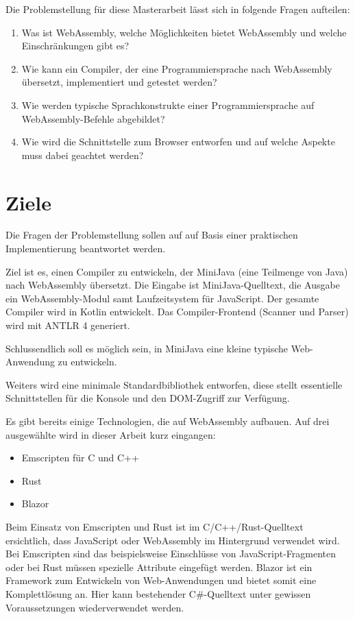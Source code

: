 Die Problemstellung für diese Masterarbeit lässt sich in folgende Fragen aufteilen:

\begin{enumerate}
	\item Was ist WebAssembly, welche Möglichkeiten bietet WebAssembly und welche Einschränkungen gibt es?
	\item Wie kann ein Compiler, der eine Programmiersprache nach WebAssembly übersetzt, implementiert und getestet werden?
	\item Wie werden typische Sprachkonstrukte einer Programmiersprache auf Web\-As\-sem\-bly-Befehle abgebildet?
	\item Wie wird die Schnittstelle zum Browser entworfen und auf welche Aspekte muss dabei geachtet werden?
\end{enumerate}

\section{Ziele}

Die Fragen der Problemstellung sollen auf auf Basis einer praktischen Implementierung beantwortet werden.

Ziel ist es, einen Compiler zu entwickeln, der MiniJava (eine Teilmenge von Java) nach WebAssembly übersetzt. Die Eingabe ist MiniJava-Quelltext, die Ausgabe ein WebAssembly-Modul samt Laufzeitsystem für JavaScript. Der gesamte Compiler wird in Kotlin entwickelt. Das Compiler-Frontend (Scanner und Parser) wird mit ANTLR 4 generiert.

Schlussendlich soll es möglich sein, in MiniJava eine kleine typische Web-Anwendung zu entwickeln.

Weiters wird eine minimale Standardbibliothek entworfen, diese stellt essentielle Schnittstellen für die Konsole und den DOM-Zugriff zur Verfügung.

Es gibt bereits einige Technologien, die auf WebAssembly aufbauen. Auf drei ausgewählte wird in dieser Arbeit kurz eingangen:
\begin{itemize}
    \item Emscripten \cite{Emscripten} für C und C++
    \item Rust \cite{RustWasmWebsite}
    \item Blazor \cite{Blazor} 
\end{itemize}

Beim Einsatz von Emscripten und Rust ist im C/C++/Rust-Quelltext ersichtlich, dass JavaScript oder WebAssembly im Hintergrund verwendet wird. Bei Emscripten sind das beispielsweise Einschlüsse von JavaScript-Fragmenten oder bei Rust müssen spezielle Attribute eingefügt werden. Blazor ist ein Framework zum Entwickeln von Web-Anwendungen und bietet somit eine Komplettlösung an. Hier kann bestehender C\#{}-Quelltext unter gewissen Voraussetzungen wiederverwendet werden.

